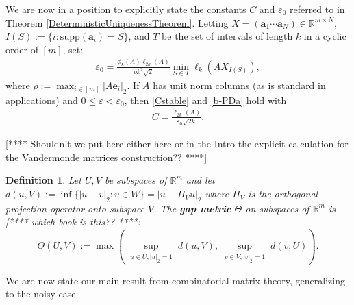 \documentclass[journal, onecolumn]{IEEEtran}
\newtheorem{definition}{Definition}
\begin{document}
We are now in a position to explicitly state the constants $C$ and $\varepsilon_0$ referred to in Theorem \ref{DeterministicUniquenessTheorem}. Letting $X  = (\mathbf{a}_1 \cdots \mathbf{a}_N) \in \mathbb{R}^{m \times N}$, $I(S) := \{i : \text{supp}(\mathbf{a}_i) = S\}$, and $T$ be the set of intervals of length $k$ in a cyclic order of $[m]$, set:
\begin{align}\label{epsilon0}
\varepsilon_0 = \frac{ \phi_k(A) \ell_{2k}(A) }{\rho k^2 \sqrt{2}} \min_{S \in T} \ell_k(AX_{I(S)}),
\end{align}
%
where $\rho := \max_{i \in [m]} |A\mathbf{e}_i|_2 $. If $A$ has unit norm columns (as is standard in applications) and $0 \leq \varepsilon < \varepsilon_0$, then \eqref{Cstable} and \eqref{b-PDa} hold with
\begin{align}\label{Cdef}
C = \frac{\ell_{2k}(A)}{ \varepsilon_0 \sqrt{2k}}.
\end{align}

[**** Shouldn't we put here either here or in the Intro the explicit calculation for the Vandermonde matrices construction?? ****]

\begin{definition}\label{GapMetricDef}
Let $U, V$ be subspaces of $\mathbb{R}^m$ and let $d(u,V) := \inf\{|u-v|_2: v \in W\} = |u - \Pi_V u|_2$ where $\Pi_V$ is the orthogonal projection operator onto subspace $V$. The \textbf{gap metric} $\Theta$ on subspaces of $\mathbb{R}^{m}$ is \cite{TheoryOfLinearOperatorsPage69} [**** which book is this?? ****:
\begin{equation}\label{SubspaceMetric}
\Theta(U,V) := \max\left( \sup_{\substack{u \in U, |u|_2 = 1}} d(u,V), \sup_{\substack{v \in V, |v|_2 = 1}} d(v,U) \right).
\end{equation}
\end{definition}

We are now state our main result from combinatorial matrix theory, generalizing \cite[Lemma 1]{Hillar15} to the noisy case.

\end{document}
